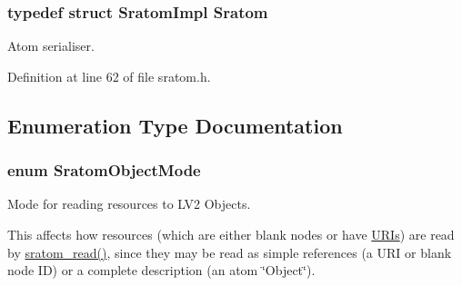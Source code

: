 \subsubsection[{\texorpdfstring{Sratom}{Sratom}}]{\setlength{\rightskip}{0pt plus 5cm}typedef struct {\bf Sratom\+Impl} {\bf Sratom}}\hypertarget{group__sratom_gaff6a49d547dbfe9f8d910f9b1ae98494}{}\label{group__sratom_gaff6a49d547dbfe9f8d910f9b1ae98494}
Atom serialiser. 

Definition at line 62 of file sratom.\+h.



\subsection{Enumeration Type Documentation}
\subsubsection[{\texorpdfstring{Sratom\+Object\+Mode}{SratomObjectMode}}]{\setlength{\rightskip}{0pt plus 5cm}enum {\bf Sratom\+Object\+Mode}}\hypertarget{group__sratom_gaf476c91b166a55d78e4aa7fc2213182f}{}\label{group__sratom_gaf476c91b166a55d78e4aa7fc2213182f}
Mode for reading resources to L\+V2 Objects.

This affects how resources (which are either blank nodes or have \hyperlink{struct_u_r_is}{U\+R\+Is}) are read by \hyperlink{group__sratom_gafe78e0e2f6ce3c69b90ae4af7d153f68}{sratom\+\_\+read()}, since they may be read as simple references (a U\+RI or blank node ID) or a complete description (an atom \char`\"{}\+Object\char`\"{}).

